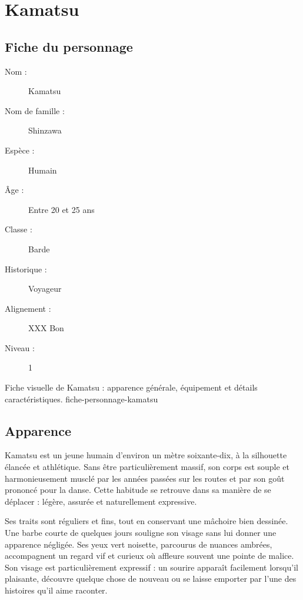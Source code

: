 \section*{Kamatsu}
{}
\label{sec:fiche-kamatsu}

\subsection*{Fiche du personnage}

\begin{description}
    \item[Nom :] Kamatsu
    \item[Nom de famille :] Shinzawa
    \item[Espèce :] Humain
    \item[Âge :] Entre 20 et 25 ans
    \item[Classe :] Barde
    \item[Historique :] Voyageur
    \item[Alignement :] XXX Bon
    \item[Niveau :] 1
\end{description}

  {Fiche visuelle de Kamatsu : apparence générale, équipement et détails caractéristiques.}
  {fiche-personnage-kamatsu}

%
%

\subsection*{Apparence}

Kamatsu est un jeune humain d'environ un mètre soixante-dix, à la silhouette
élancée et athlétique. Sans être particulièrement massif, son corps est
souple et harmonieusement musclé par les années passées sur les routes et
par son goût prononcé pour la danse. Cette habitude se retrouve dans sa
manière de se déplacer : légère, assurée et naturellement expressive.

Ses traits sont réguliers et fins, tout en conservant une mâchoire bien
dessinée. Une barbe courte de quelques jours souligne son visage sans lui
donner une apparence négligée. Ses yeux vert noisette, parcourus de nuances
ambrées, accompagnent un regard vif et curieux où affleure souvent une pointe
de malice. Son visage est particulièrement expressif : un sourire apparaît
facilement lorsqu'il plaisante, découvre quelque chose de nouveau ou se
laisse emporter par l'une des histoires qu'il aime raconter.

